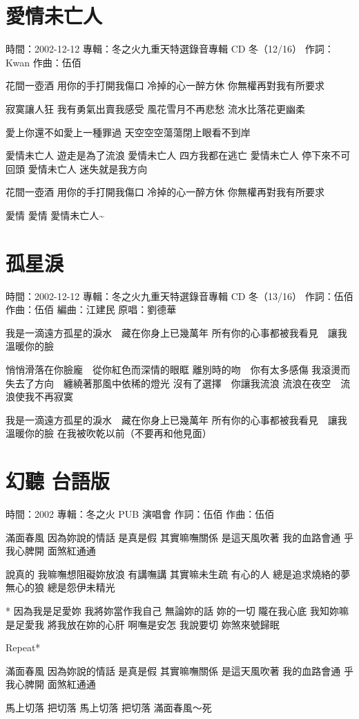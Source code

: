 \documentclass[UTF8,a4paper,oneside,twocolumn,12pt]{ctexbook}
\newcommand{\infopair}[2]{\textbullet #1：#2}
\newcommand{\zc}[1][伍佰]{\infopair{作詞}{#1}}
\newcommand{\zq}[1][伍佰]{\infopair{作曲}{#1}}
\newcommand{\bq}[1][伍佰]{\infopair{編曲}{#1}}
\newcommand{\zj}[1]{\infopair{專輯}{#1}}
\newcommand{\yc}[1]{\infopair{原唱}{#1}}
\newcommand{\sj}[1]{\infopair{時間}{#1}}
\newenvironment{info}{\begin{flushleft}\kaishu
	}
	{\end{flushleft}\normalsize\yahei\par}
\newenvironment{lyric}{
	}
{}
\begin{document}
\section{愛情未亡人}
\begin{info}
	\sj{2002-12-12}
	\zj{冬之火九重天特選錄音專輯 CD 冬（12/16）}
	\zc[Kwan]
	\zq
\end{info}
\begin{lyric}
	花間一壺酒 用你的手打開我傷口
	冷掉的心一醉方休 你無權再對我有所要求

	寂寞讓人狂 我有勇氣出賣我感受
	風花雪月不再悲愁 流水比落花更幽柔

	愛上你還不如愛上一種罪過
	天空空空蕩蕩閉上眼看不到岸

	愛情未亡人 遊走是為了流浪
	愛情未亡人 四方我都在逃亡
	愛情未亡人 停下來不可回頭
	愛情未亡人 迷失就是我方向

	花間一壺酒 用你的手打開我傷口
	冷掉的心一醉方休 你無權再對我有所要求

	愛情 愛情 愛情未亡人\textasciitilde
\end{lyric}

\section{孤星淚}
\begin{info}
	\sj{2002-12-12}
	\zj{冬之火九重天特選錄音專輯 CD 冬（13/16）}
	\zc
	\zq
	\bq[江建民]
	\yc{劉德華}
\end{info}
\begin{lyric}
	我是一滴遠方孤星的淚水　藏在你身上已幾萬年
	所有你的心事都被我看見　讓我溫暖你的臉

	悄悄滑落在你臉龐　從你紅色而深情的眼眶
	離別時的吻　你有太多感傷
	我滾燙而失去了方向　纏繞著那風中依稀的燈光
	沒有了選擇　你讓我流浪
	流浪在夜空　流浪使我不再寂寞

	我是一滴遠方孤星的淚水　藏在你身上已幾萬年
	所有你的心事都被我看見　讓我溫暖你的臉
	在我被吹乾以前（不要再和他見面）
\end{lyric}

\section{幻聽 台語版}
\begin{info}
	\sj{2002}
	\zj{冬之火 PUB 演唱會}
	\zc
	\zq
\end{info}
\begin{lyric}
	滿面春風 因為妳說的情話 是真是假 其實嘛嘸關係 是這天風吹著 我的血路會通 乎我心脾開 面煞紅通通

	說真的 我嘛嘸想阻礙妳放浪 有講嘸講 其實嘛未生疏 有心的人 總是追求燒絡的夢 無心的狼 總是怨伊未精光

	* 因為我是足愛妳 我將妳當作我自己 無論妳的話 妳的一切 隴在我心底
	我知妳嘛是足愛我 將我放在妳的心肝 啊嘸是安怎 我說要切 妳煞來號歸眠

	Repeat*

	滿面春風 因為妳說的情話 是真是假 其實嘛嘸關係 是這天風吹著 我的血路會通 乎我心脾開 面煞紅通通

	馬上切落 把切落 馬上切落 把切落 滿面春風～死
\end{lyric}
\end{document}
